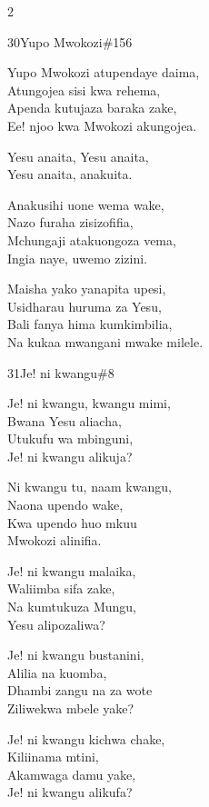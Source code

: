 \documentclass{article}
\begin{document}
\begin{multicols}{2}
\begin{hymn}{30}{Yupo Mwokozi}{\#156}
\begin{stanza}
Yupo Mwokozi atupendaye daima,\\
Atungojea sisi kwa rehema,\\
Apenda kutujaza baraka zake,\\
Ee! njoo kwa Mwokozi akungojea.
\end{stanza}
\begin{chorus}
Yesu anaita, Yesu anaita,\\
Yesu anaita, anakuita.
\end{chorus}
\begin{stanza}
Anakusihi uone wema wake,\\
Nazo furaha zisizofifia,\\
Mchungaji atakuongoza vema,\\
Ingia naye, uwemo zizini.
\end{stanza}
\begin{stanza}
Maisha yako yanapita upesi,\\
Usidharau huruma za Yesu,\\
Bali fanya hima kumkimbilia,\\
Na kukaa mwangani mwake milele.
\end{stanza}
\end{hymn}

\begin{hymn}{31}{Je! ni kwangu}{\#8}
\begin{stanza}
Je! ni kwangu, kwangu mimi,\\
Bwana Yesu aliacha,\\
Utukufu wa mbinguni,\\
Je! ni kwangu alikuja?
\end{stanza}
\begin{chorus}
Ni kwangu tu, naam kwangu,\\
Naona upendo wake,\\
Kwa upendo huo mkuu\\
Mwokozi alinifia.
\end{chorus}
\begin{stanza}
Je! ni kwangu malaika,\\
Waliimba sifa zake,\\
Na kumtukuza Mungu,\\
Yesu alipozaliwa?
\end{stanza}
\begin{stanza}
Je! ni kwangu bustanini,\\
Alilia na kuomba,\\
Dhambi zangu na za wote\\
Ziliwekwa mbele yake?
\end{stanza}
\begin{stanza}
Je! ni kwangu kichwa chake,\\
Kiliinama mtini,\\
Akamwaga damu yake,\\
Je! ni kwangu alikufa?
\end{stanza}
\end{hymn}


\end{multicols}
\end{document}
